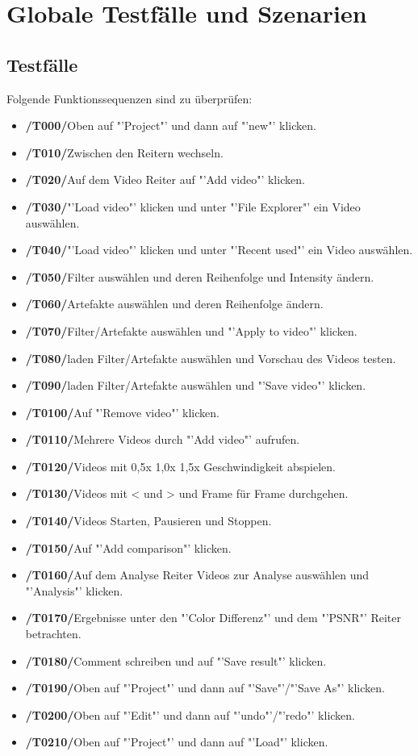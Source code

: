 \documentclass[parskip=full]{scrartcl}
\begin{document}
\section{Globale Testfälle und Szenarien}
\subsection{Testfälle}
Folgende Funktionssequenzen sind zu überprüfen:
\begin{itemize}
\item[]\textbf{/T000/}\qquad Oben auf "'Project"' und dann auf "'new"' klicken.
\item[]\textbf{/T010/}\qquad Zwischen den Reitern wechseln.
\item[]\textbf{/T020/}\qquad Auf dem Video Reiter auf "'Add video"' klicken.
\item[]\textbf{/T030/}\qquad "'Load video"' klicken und unter "'File Explorer"' ein Video auswählen.
\item[]\textbf{/T040/}\qquad "'Load video"' klicken und unter "'Recent used"' ein Video auswählen.
\item[]\textbf{/T050/}\qquad Filter auswählen und deren Reihenfolge und Intensity ändern.
\item[]\textbf{/T060/}\qquad Artefakte auswählen und deren Reihenfolge  ändern.
\item[]\textbf{/T070/}\qquad Filter/Artefakte auswählen und "'Apply to video"' klicken.
\item[]\textbf{/T080/}\qquad laden Filter/Artefakte auswählen und Vorschau des Videos testen.
\item[]\textbf{/T090/}\qquad laden Filter/Artefakte auswählen und "'Save video"' klicken.
\item[]\textbf{/T0100/}\qquad Auf "'Remove video"' klicken.
\item[]\textbf{/T0110/}\qquad Mehrere Videos durch "'Add video"' aufrufen.
\item[]\textbf{/T0120/}\qquad Videos mit 0,5x 1,0x 1,5x Geschwindigkeit abspielen.
\item[]\textbf{/T0130/}\qquad Videos mit < und > und Frame für Frame  durchgehen.
\item[]\textbf{/T0140/}\qquad Videos Starten, Pausieren und Stoppen.
\item[]\textbf{/T0150/}\qquad Auf "'Add comparison"' klicken.
\item[]\textbf{/T0160/}\qquad Auf dem Analyse Reiter Videos zur Analyse auswählen und "'Analysis"' klicken.
\item[]\textbf{/T0170/}\qquad Ergebnisse unter den "'Color Differenz"' und dem "'PSNR"' Reiter betrachten.
\item[]\textbf{/T0180/}\qquad Comment schreiben und auf "'Save result"' klicken.
\item[]\textbf{/T0190/}\qquad Oben auf "'Project"' und dann auf "'Save"'/"'Save As"' klicken.
\item[]\textbf{/T0200/}\qquad Oben auf "'Edit"' und dann auf "'undo"'/"'redo"' klicken.
\item[]\textbf{/T0210/}\qquad Oben auf "'Project"' und dann auf "'Load"' klicken.
\end{itemize}
\end{document}
